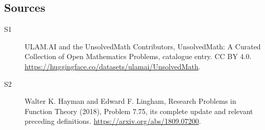 \documentclass[11pt]{article}
\begin{document}
\subsection{Sources}
\begin{description}
\item[\hypertarget{source:statement:1}{S1}] ULAM.AI and the UnsolvedMath Contributors, UnsolvedMath: A Curated Collection of Open Mathematics Problems, catalogue entry. CC BY 4.0. \url{https://huggingface.co/datasets/ulamai/UnsolvedMath}.
\item[\hypertarget{source:statement:2}{S2}] Walter K. Hayman and Edward F. Lingham, Research Problems in Function Theory (2018), Problem 7.75, its complete update and relevant preceding definitions. \url{https://arxiv.org/abs/1809.07200}.
\end{description}
\label{end:statement}
\end{document}
